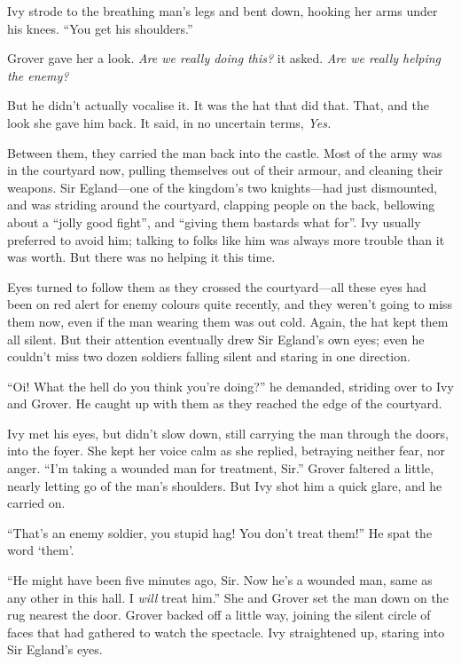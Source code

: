 Ivy strode to the breathing man's legs and bent down, hooking her arms under his knees.
``You get his shoulders.''

Grover gave her a look.
\emph{Are we really doing this?} it asked.
\emph{Are we really helping the enemy?}

But he didn't actually vocalise it.
It was the hat that did that.
That, and the look she gave him back.
It said, in no uncertain terms, \emph{Yes.}

\storybreak

Between them, they carried the man back into the castle.
Most of the army was in the courtyard now, pulling themselves out of their armour, and cleaning their weapons.
Sir Egland---one of the kingdom's two knights---had just dismounted, and was striding around the courtyard, clapping people on the back, bellowing about a ``jolly good fight'', and ``giving them bastards what for''.
Ivy usually preferred to avoid him; talking to folks like him was always more trouble than it was worth.
But there was no helping it this time.

Eyes turned to follow them as they crossed the courtyard---all these eyes had been on red alert for enemy colours quite recently, and they weren't going to miss them now, even if the man wearing them was out cold.
Again, the hat kept them all silent.
But their attention eventually drew Sir Egland's own eyes; even he couldn't miss two dozen soldiers falling silent and staring in one direction.

``Oi! What the hell do you think you're doing?'' he demanded, striding over to Ivy and Grover.
He caught up with them as they reached the edge of the courtyard.

Ivy met his eyes, but didn't slow down, still carrying the man through the doors, into the foyer.
She kept her voice calm as she replied, betraying neither fear, nor anger.
``I'm taking a wounded man for treatment, Sir.''
Grover faltered a little, nearly letting go of the man's shoulders.
But Ivy shot him a quick glare, and he carried on.

``That's an enemy soldier, you stupid hag!
You don't treat them!''
He spat the word `them'.

``He might have been five minutes ago, Sir.
Now he's a wounded man, same as any other in this hall.
I \emph{will} treat him.''
She and Grover set the man down on the rug nearest the door.
Grover backed off a little way, joining the silent circle of faces that had gathered to watch the spectacle.
Ivy straightened up, staring into Sir Egland's eyes.

